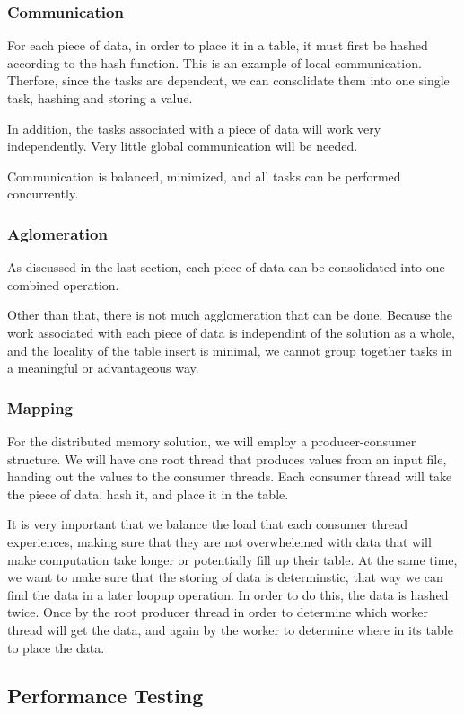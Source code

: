 \documentclass{article}
\begin{document}
\subsubsection{Communication}
For each piece of data, in order to place it in a table, it must first be hashed according to the hash function. This is an example of local communication. Therfore, since the tasks are dependent, we can consolidate them into one single task, hashing and storing a value.

In addition, the tasks associated with a piece of data will work very independently. Very little global communication will be needed.

Communication is balanced, minimized, and all tasks can be performed concurrently.

\subsubsection{Aglomeration}
As discussed in the last section, each piece of data can be consolidated into one combined operation.

Other than that, there is not much agglomeration that can be done. Because the work associated with each piece of data is independint of the solution as a whole, and the locality of the table insert is minimal, we cannot group together tasks in a meaningful or advantageous way.

\subsubsection{Mapping}
For the distributed memory solution, we will employ a producer-consumer structure. We will have one root thread that produces values from an input file, handing out the values to the consumer threads. Each consumer thread will take the piece of data, hash it, and place it in the table.

It is very important that we balance the load that each consumer thread experiences, making sure that they are not overwhelemed with data that will make computation take longer or potentially fill up their table. At the same time, we want to make sure that the storing of data is determinstic, that way we can find the data in a later loopup operation. In order to do this, the data is hashed twice. Once by the root producer thread in order to determine which worker thread will get the data, and again by the worker to determine where in its table to place the data.



\subsection{Performance Testing}
\end{document}
